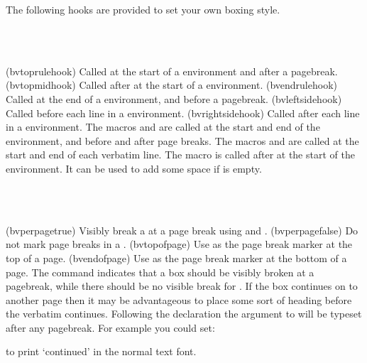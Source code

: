 {{{{    The following hooks are provided to set your own 
boxing style.
\begin{syntax}
\cmd{\bvtoprulehook} \cmd{\bvtopmidhook} \cmd{\bvendrulehook} \\
\cmd{\bvleftsidehook} \cmd{\bvrightsidehook} \\
\end{syntax}
\glossary(bvtoprulehook)%
  {}%
  {Called at the start of a  environment and after a pagebreak.}
\glossary(bvtopmidhook)%
  {}%
  {Called after  at the start of a  environment.}
\glossary(bvendrulehook)%
  {}%
  {Called at the end of a  environment, and before a pagebreak.}
\glossary(bvleftsidehook)%
  {}%
  {Called before each line in a  environment.}
\glossary(bvrightsidehook)%
  {}%
  {Called after each line in a  environment.}
The macros \cmd{\bvtoprulehook} and \cmd{\bvendrulehook} are called at
the start and end of the  environment, and before and after
page breaks. The macros
\cmd{\bvleftsidehook} and \cmd{\bvrightsidehook} are called at the start
and end of each verbatim line. The macro \cmd{\bvtopmidhook} is
called after \cmd{\bvtoprulehook} at the start of the environment.
It can be used to add some space if \cmd{\bvtoprulehook} is empty.

\begin{syntax}
\cmd{\bvperpagetrue} \cmd{\bvperpagefalse} \\
\cmd{\bvtopofpage} \cmd{\bvendofpage} \\
\end{syntax}
\glossary(bvperpagetrue)%
  {}%
  {Visibly break a  at a page break using 
   and .}
\glossary(bvperpagefalse)%
  {}%
  {Do not mark page breaks in a .}
\glossary(bvtopofpage)%
  {}%
  {Use  as the  page break marker at the top of 
   a page.}
\glossary(bvendofpage)%
  {}%
  {Use  as the  page break marker at the bottom 
   of a page.}
The command \cmd{\bvperpagetrue} indicates
that a box should be visibly broken at a pagebreak, while there should
be no visible break for \cmd{\bvperpagefalse}. 
If the box continues on to another page then it may be advantageous
to place some sort of heading before the verbatim continues. Following
the declaration \cmd{\bvperpagetrue} the  argument to
\cmd{\bvtopofpage} will be typeset after any pagebreak. For example you
could set:
\begin{lcode}
\end{lcode}
to print `continued' in the normal text font. 

}}}}
